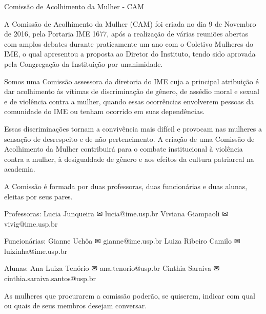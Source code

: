 \begin{subsecao}{Comissão de Acolhimento da Mulher - CAM}

A Comissão de Acolhimento da Mulher (CAM) foi criada no dia 9 de Novembro de 2016,
pela Portaria IME 1677, após a realização de várias reuniões abertas com amplos
debates durante praticamente um ano com o Coletivo Mulheres do IME, o qual 
apresentou a proposta ao Diretor do Instituto, tendo sido aprovada pela Congregação
da Instituição por unanimidade.

Somos uma Comissão assessora da diretoria do IME cuja a principal atribuição 
é dar acolhimento às vítimas de discriminação de gênero, de assédio moral e 
sexual e de violência contra a mulher, quando essas ocorrências envolverem 
pessoas da comunidade do IME ou tenham ocorrido em suas dependências.

Essas discriminações tornam a convivência mais difícil e provocam nas mulheres
a sensação de desrespeito e de não pertencimento. A criação de uma Comissão de 
Acolhimento da Mulher contribuirá para o combate institucional à violência contra
a mulher, à desigualdade de gênero e aos efeitos da cultura patriarcal na academia.

A Comissão é formada por duas professoras, duas funcionárias e duas alunas, 
eleitas por seus pares. 

Professoras:
Lucia Junqueira ✉ lucia@ime.usp.br
Viviana Giampaoli ✉ vivig@ime.usp.br

Funcionárias:
Gianne Uchôa ✉ gianne@ime.usp.br
Luiza Ribeiro Camilo ✉ luizinha@ime.usp.br

Alunas:
Ana Luiza Tenório ✉ ana.tenorio@usp.br
Cinthia Saraiva ✉ cinthia.saraiva.santos@usp.br


As mulheres que procurarem a comissão poderão, se quiserem, indicar com qual ou quais de seus membros desejam conversar.


\end{subsecao}
